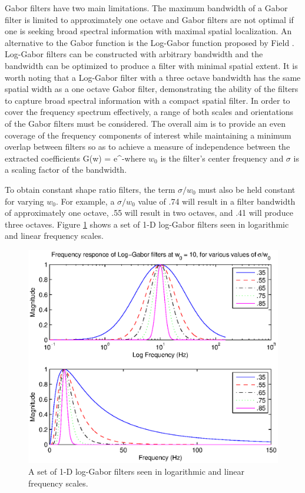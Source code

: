 Gabor filters have two main limitations. The maximum bandwidth of a
Gabor filter is limited to approximately one octave and Gabor
filters are not optimal if one is seeking broad spectral information
with maximal spatial localization. An alternative to the Gabor
function is the Log-Gabor function proposed by Field
\cite{fields87}. Log-Gabor filters can be constructed with arbitrary
bandwidth and the bandwidth can be optimized to produce a filter
with minimal spatial extent. It is worth noting that a Log-Gabor
filter with a three octave bandwidth has the same spatial width as a
one octave Gabor filter, demonstrating the ability of the filters to
capture broad spectral information with a compact spatial filter. In
order to cover the frequency spectrum effectively, a range of both
scales and orientations of the Gabor filters must be considered. The
overall aim is to provide an even coverage of the frequency
components of interest while maintaining a minimum overlap between
filters so as to achieve a measure of independence between the
extracted coefficients \beq \label{eq_log_gabor} \displaystyle G(w)
= e^{-}\eeq where $w_0$
is the filter's center frequency and $\sigma$ is a scaling factor of
the bandwidth.

To obtain constant shape ratio filters, the term $\sigma/w_0$ must
also be held constant for varying $w_0$. For example, a $\sigma/w_0$
value of .74 will result in a filter bandwidth of approximately one
octave, .55 will result in two octaves, and .41 will produce three
octaves. Figure \ref{fig_logGabor_frequency_resp} shows a set of 1-D
log-Gabor filters seen in logarithmic and linear frequency scales.

\begin{figure}[tbp]
\begin{center}
\includegraphics[scale = .6]{./chapters/figures/logGabor_frequeny.eps}
\caption{A set of 1-D log-Gabor filters seen in logarithmic and
linear frequency scales.}\label{fig_logGabor_frequency_resp}
\end{center}
\end{figure}

